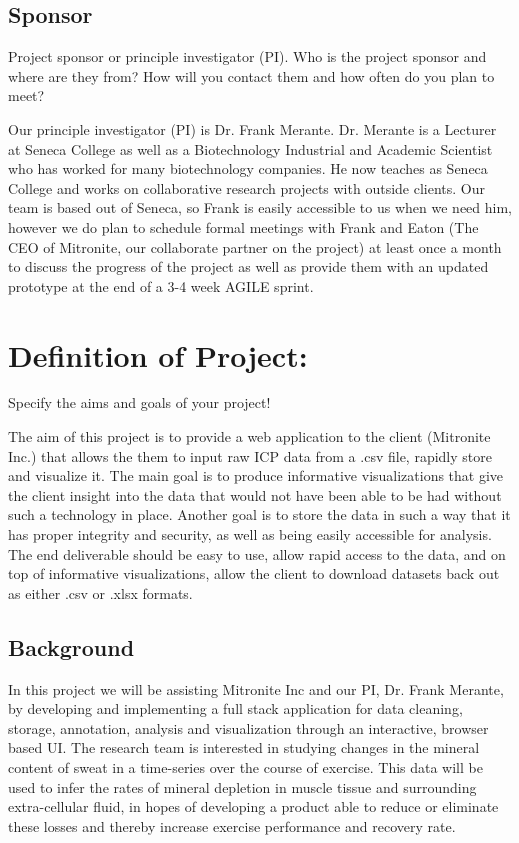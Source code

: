 \documentclass[10pt,twocolumn,letterpaper]{article}
\begin{document}
            	\subsection{Sponsor}

            	Project sponsor or principle investigator (PI).
		Who is the project sponsor and where are they from? 
		How will you contact them and how often do you plan to meet?

		Our principle investigator (PI) is Dr. Frank Merante. 
		Dr. Merante is a Lecturer at Seneca College as well as a Biotechnology Industrial and Academic Scientist who has worked for many biotechnology companies.
		He now teaches as Seneca College and works on collaborative research projects with outside clients. 
		Our team is based out of Seneca, so Frank is easily accessible to us when we need him, however we do plan to schedule formal meetings with Frank and Eaton (The CEO of
		Mitronite, our collaborate partner on the project) at least once a month to discuss the progress of the project as well as provide them with an updated prototype at the
		end of a 3-4 week AGILE sprint.
		
		\section{Definition of Project:}

        Specify the aims and goals of your project!
		
		The aim of this project is to provide a web application to the client (Mitronite Inc.) that allows the them to input raw ICP data from a .csv file, rapidly store and 
		visualize it. 
		The main goal is to produce informative visualizations that give the client insight into the data that would not have been able to be had without such a technology in 
		place.
		Another goal is to store the data in such a way that it has proper integrity and security, as well as being easily accessible for analysis.
		The end deliverable should be easy to use, allow rapid access to the data, and on top of informative visualizations, allow the client to download datasets back out as 
		either .csv or .xlsx formats.
		
            \subsection{Background}

            In this project we will be assisting Mitronite Inc and our PI, Dr. Frank Merante, by developing and implementing a full stack application for data cleaning, storage, 
	    annotation, analysis and visualization through an interactive, browser based UI. 
	    The research team is interested in studying changes in the mineral content of sweat in a time-series over the course of exercise. This data will be used to infer the 
	    rates of mineral depletion in muscle tissue and surrounding extra-cellular fluid, in hopes of developing a product able to reduce or eliminate these losses and 
	    thereby increase exercise performance and recovery rate.
\end{document}
